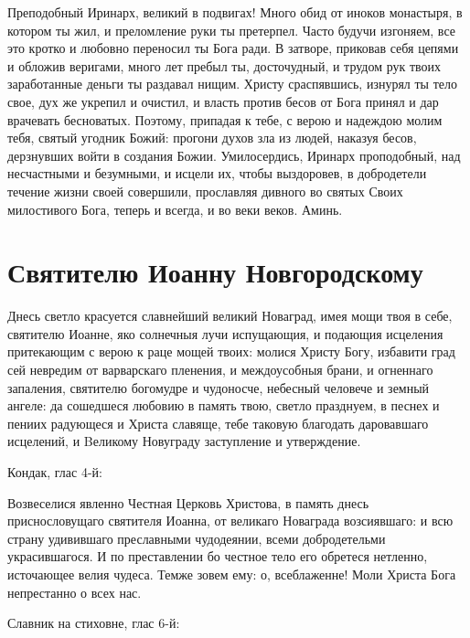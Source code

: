 

Преподобный Иринарх, великий в подвигах! Много обид от иноков монастыря, в котором ты жил, и преломление руки ты претерпел. Часто будучи изгоняем, все это кротко и любовно переносил ты Бога ради. В затворе, приковав себя цепями и обложив веригами, много лет пребыл ты, досточудный, и трудом рук твоих заработанные деньги ты раздавал нищим. Христу сраспявшись, изнурял ты тело свое, дух же укрепил и очистил, и власть против бесов от Бога принял и дар врачевать бесноватых. Поэтому, припадая к тебе, с верою и надеждою молим тебя, святый угодник Божий: прогони духов зла из людей, наказуя бесов, дерзнувших войти в создания Божии. Умилосердись, Иринарх проподобный, над несчастными и безумными, и исцели их, чтобы выздоровев, в добродетели течение жизни своей совершили, прославляя дивного во святых Своих милостивого Бога, теперь и всегда, и во веки веков. Аминь.


\section{Святителю Иоанну Новгородскому}
 





  Днесь светло красуется славнейший великий Новаград, имея мощи твоя в себе, святителю Иоанне, яко солнечныя лучи испущающия, и подающия исцеления притекающим с верою к раце мощей твоих: молися Христу Богу, избавити град сей невредим от варварскаго пленения, и междоусобныя брани, и огненнаго запаления, святителю богомудре и чудоносче, небесный человече и земный ангеле: да сошедшеся любовию в память твою, светло празднуем, в песнех и пениих радующеся и Христа славяще, тебе таковую благодать даровавшаго исцелений, и Bеликому Новуграду заступление и утверждение. 


\bfseries 

Кондак, глас 4-й:\normalfont{}\nopagebreak


  Возвеселися явленно Честная Церковь Христова, в память днесь приснословущаго святителя Иоанна, от великаго Новаграда возсиявшаго: и всю страну удивившаго преславными чудодеянии, всеми добродетельми украсившагося. И по преставлении бо честное тело его обретеся нетленно, источающее велия чудеса. Темже зовем ему: о, всеблаженне! Моли Христа Бога непрестанно о всех нас. 


\bfseries 

Славник на стиховне, глас 6-й:\normalfont{}\nopagebreak


